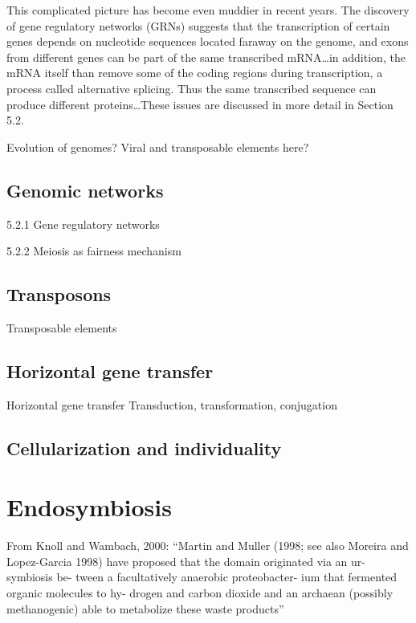 \documentclass{tufte-book} %
\begin{document}
This complicated picture has become even muddier in recent years. The discovery of gene regulatory networks (GRNs) suggests that the transcription of certain genes depends on nucleotide sequences located faraway on the genome, and exons from different genes can be part of the same transcribed mRNA…in addition, the mRNA itself than remove some of the coding regions during transcription, a process called alternative splicing. Thus the same transcribed sequence can produce different proteins…These issues are discussed in more detail in Section 5.2.


Evolution of genomes? Viral and transposable elements here?


\section{Genomic networks}\label{gene-net}

	5.2.1	Gene regulatory networks

	5.2.2	Meiosis as fairness mechanism

\section{Transposons}\label{transposons}

Transposable elements

\section{Horizontal gene transfer}
Horizontal gene transfer
    Transduction, transformation, conjugation
    
\section{Cellularization and individuality}




\chapter{Endosymbiosis}\label{endosymbiosis}

From Knoll and Wambach, 2000: “Martin and Muller (1998; see also Moreira and Lopez-Garcia 1998) have proposed that the domain originated via an ur-symbiosis be- tween a facultatively anaerobic proteobacter- ium that fermented organic molecules to hy- drogen and carbon dioxide and an archaean (possibly methanogenic) able to metabolize these waste products”
\end{document}
